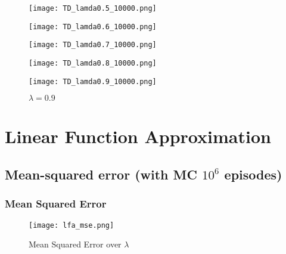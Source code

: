\documentclass{beamer}
\begin{document}
\begin{frame}
\begin{figure}[ht]
        \begin{minipage}[b]{0.15\linewidth}
        \centering
        \texttt{[image: TD\_lamda0.5\_10000.png]}
        {\caption*{$\lambda = 0.5$}}
        \end{minipage}
        \hspace{0.02 \linewidth}
        \begin{minipage}[b]{0.15\linewidth}
        \centering
        \texttt{[image: TD\_lamda0.6\_10000.png]}
        {\caption*{$\lambda = 0.6$}}
        \end{minipage}
        \hspace{0.02 \linewidth}
        \begin{minipage}[b]{0.15\linewidth}
        \centering
        \texttt{[image: TD\_lamda0.7\_10000.png]}
        {\caption*{$\lambda = 0.7$}}
        \end{minipage}
        \hspace{0.02 \linewidth}
        \begin{minipage}[b]{0.15\linewidth}
        \centering
        \texttt{[image: TD\_lamda0.8\_10000.png]}
        {\caption*{$\lambda = 0.8$}}
        \end{minipage}
        \hspace{0.02 \linewidth}
        \hspace{0.02 \linewidth}
        \begin{minipage}[b]{0.15\linewidth}
        \centering
        \texttt{[image: TD\_lamda0.9\_10000.png]}
        {\caption*{$\lambda = 0.9$}}
        \end{minipage}
        \hspace{0.02 \linewidth}

        \end{figure}
\end{frame}
\section{Linear Function Approximation}
\subsection{Mean-squared error (with MC $10^6$ episodes)}
\begin{frame}
    \frametitle{Mean Squared Error}
    \begin{figure}[!ht]
		\centering
		\texttt{[image: lfa\_mse.png]}
		\caption{Mean Squared Error over $\lambda$}
	\end{figure}
\end{frame}
\end{document}
